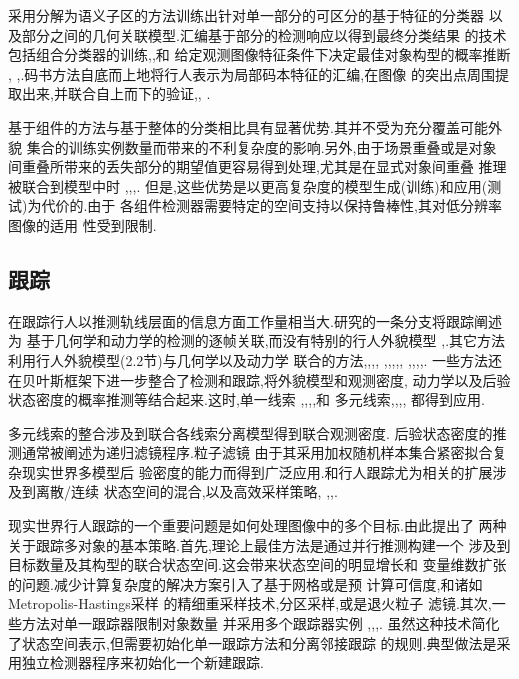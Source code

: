 \documentclass[10pt,letterpaper,journal,compsoc]{IEEEtran}
\begin{document}
采用分解为语义子区的方法训练出针对单一部分的可区分的基于特征的分类器
以及部分之间的几何关联模型.汇编基于部分的检测响应以得到最终分类结果
的技术包括组合分类器的训练\cite{bib2},\cite{bib48},\cite{bib62}和
给定观测图像特征条件下决定最佳对象构型的概率推断
\cite{bib45},\cite{bib65}
,\cite{bib76}.码书方法自底而上地将行人表示为局部码本特征的汇编,在图像
的突出点周围提取出来,并联合自上而下的验证\cite{bib39},\cite{bib40},
\cite{bib61}.

基于组件的方法与基于整体的分类相比具有显著优势.其并不受为充分覆盖可能外貌
集合的训练实例数量而带来的不利复杂度的影响.另外,由于场景重叠或是对象
间重叠所带来的丢失部分的期望值更容易得到处理,尤其是在显式对象间重叠
推理被联合到模型中时
\cite{bib39},\cite{bib40},\cite{bib61},\cite{bib76}.
但是,这些优势是以更高复杂度的模型生成(训练)和应用(测试)为代价的.由于
各组件检测器需要特定的空间支持以保持鲁棒性,其对低分辨率图像的适用
性受到限制.
\subsection{跟踪}
在跟踪行人以推测轨线层面的信息方面工作量相当大.研究的一条分支将跟踪阐述为
基于几何学和动力学的检测的逐帧关联,而没有特别的行人外貌模型\cite{bib2}
,\cite{bib23}.其它方法利用行人外貌模型(2.2节)与几何学以及动力学
联合的方法\cite{bib4},\cite{bib26},\cite{bib32},\cite{bib39},
\cite{bib43},\cite{bib50},\cite{bib55},\cite{bib58},\cite{bib65},
\cite{bib70},\cite{bib76},\cite{bib77},\cite{bib80},\cite{bib82}.
一些方法还在贝叶斯框架下进一步整合了检测和跟踪,将外貌模型和观测密度,
动力学以及后验状态密度的概率推测等结合起来.这时,单一线索
\cite{bib4},\cite{bib26},\cite{bib55},\cite{bib70},\cite{bib76}和
多元线索\cite{bib32},\cite{bib43},\cite{bib50},\cite{bib58},
\cite{bib65}都得到应用.

多元线索的整合\cite{bib66}涉及到联合各线索分离模型得到联合观测密度.
后验状态密度的推测通常被阐述为递归滤镜程序\cite{bib3}.粒子滤镜
\cite{bib30}由于其采用加权随机样本集合紧密拟合复杂现实世界多模型后
验密度的能力而得到广泛应用.和行人跟踪尤为相关的扩展涉及到离散/连续
状态空间的混合\cite{bib26},\cite{bib50}以及高效采样策略\cite{bib13},
\cite{bib32},\cite{bib36},\cite{bib44}.

现实世界行人跟踪的一个重要问题是如何处理图像中的多个目标.由此提出了
两种关于跟踪多对象的基本策略.首先,理论上最佳方法是通过并行推测构建一个
涉及到目标数量及其构型的联合状态空间.这会带来状态空间的明显增长和
变量维数扩张的问题.减少计算复杂度的解决方案引入了基于网格或是预
计算可信度\cite{bib32},\cite{bib69}和诸如Metropolis-Hastings采样
\cite{bib36}的精细重采样技术,分区采样\cite{bib44},或是退火粒子
滤镜\cite{bib13}.其次,一些方法对单一跟踪器限制对象数量
并采用多个跟踪器实例
\cite{bib31},\cite{bib35},\cite{bib50},\cite{bib52}.
虽然这种技术简化了状态空间表示,但需要初始化单一跟踪方法和分离邻接跟踪
的规则.典型做法是采用独立检测器程序来初始化一个新建跟踪.
\end{document}
